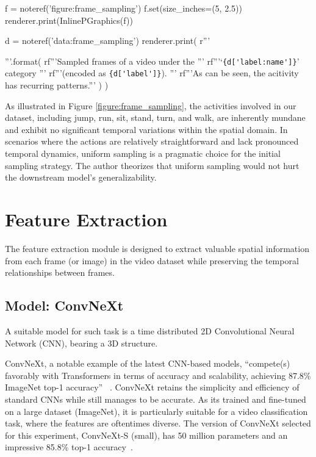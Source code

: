 \documentclass[letterpaper]{article} %
\begin{document}
\begin{figure*}[t]
  \centering
  \renewcommand\sffamily{}
  \begin{python}
    f = noteref('figure:frame_sampling')
    f.set(size_inches=(5, 2.5))
    renderer.print(InlinePGraphics(f))
  \end{python}
  \begin{python}
    d = noteref('data:frame_sampling')
    renderer.print(
      r'''\caption{{{}}}\label{{figure:frame_sampling}}'''.format(
        rf'''Sampled frames of a video under the '''
        rf'''`\lstinline|{d['label:name']}|' category '''
        rf'''(encoded as \lstinline|{d['label']}|). '''
        rf'''As can be seen, the acitivity has recurring patterns.'''
      )
    )
  \end{python}
\end{figure*}

As illustrated in Figure \ref{figure:frame_sampling}, 
the activities involved in our dataset, 
including jump, run, sit, stand, turn, and walk, 
are inherently mundane and exhibit no significant temporal variations within the spatial domain. 
In scenarios where the actions are relatively straightforward and lack pronounced temporal dynamics, 
uniform sampling is a pragmatic choice for the initial sampling strategy.
The author theorizes that uniform sampling would not hurt the downstream model's
generalizability.

\section{Feature Extraction}
The feature extraction module is designed to 
extract valuable spatial information from each frame (or image) 
in the video dataset while preserving 
the temporal relationships between frames.

\subsection{Model: ConvNeXt}
A suitable model for such task is
a time distributed 2D Convolutional Neural Network (CNN),
bearing a 3D structure. 

ConvNeXt, a notable example of the latest CNN-based models,
``compete(s) favorably with Transformers in terms of 
accuracy and scalability, achieving 87.8\% ImageNet top-1 accuracy''
~\citep{liu2022convnet}.
ConvNeXt retains the simplicity and efficiency of standard CNNs
while still manages to be accurate.
As its trained and fine-tuned on a large dataset (ImageNet),
it is particularly suitable for a video classification task,
where the features are oftentimes diverse.
The version of ConvNeXt selected for this experiment,
ConvNeXt-S (small), has 50 million parameters 
and an impressive 85.8\% top-1 accuracy~\citep{liu2022convnet}.
\end{document}
